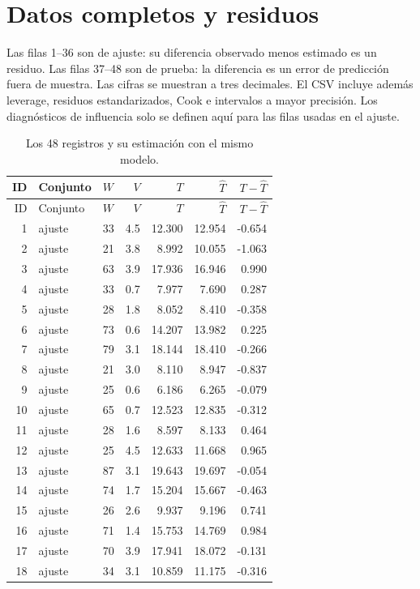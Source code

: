 \documentclass[11pt,a4paper]{article}
\begin{document}
\section{Datos completos y residuos}
Las filas 1--36 son de ajuste: su diferencia observado menos estimado es un residuo. Las filas 37--48 son de prueba: la diferencia es un error de predicción fuera de muestra. Las cifras se muestran a tres decimales. El CSV incluye además leverage, residuos estandarizados, Cook e intervalos a mayor precisión. Los diagnósticos de influencia solo se definen aquí para las filas usadas en el ajuste.
\small
\begin{longtable}{rllrrrr}
\caption{Los 48 registros y su estimación con el mismo modelo.}\\
\toprule ID & Conjunto & $W$ & $V$ & $T$ & $\widehat T$ & $T-\widehat T$\\\midrule\endfirsthead
\toprule ID & Conjunto & $W$ & $V$ & $T$ & $\widehat T$ & $T-\widehat T$\\\midrule\endhead
1 & ajuste & 33 & 4.5 & 12.300 & 12.954 & -0.654\\
2 & ajuste & 21 & 3.8 & 8.992 & 10.055 & -1.063\\
3 & ajuste & 63 & 3.9 & 17.936 & 16.946 & 0.990\\
4 & ajuste & 33 & 0.7 & 7.977 & 7.690 & 0.287\\
5 & ajuste & 28 & 1.8 & 8.052 & 8.410 & -0.358\\
6 & ajuste & 73 & 0.6 & 14.207 & 13.982 & 0.225\\
7 & ajuste & 79 & 3.1 & 18.144 & 18.410 & -0.266\\
8 & ajuste & 21 & 3.0 & 8.110 & 8.947 & -0.837\\
9 & ajuste & 25 & 0.6 & 6.186 & 6.265 & -0.079\\
10 & ajuste & 65 & 0.7 & 12.523 & 12.835 & -0.312\\
11 & ajuste & 28 & 1.6 & 8.597 & 8.133 & 0.464\\
12 & ajuste & 25 & 4.5 & 12.633 & 11.668 & 0.965\\
13 & ajuste & 87 & 3.1 & 19.643 & 19.697 & -0.054\\
14 & ajuste & 74 & 1.7 & 15.204 & 15.667 & -0.463\\
15 & ajuste & 26 & 2.6 & 9.937 & 9.196 & 0.741\\
16 & ajuste & 71 & 1.4 & 15.753 & 14.769 & 0.984\\
17 & ajuste & 70 & 3.9 & 17.941 & 18.072 & -0.131\\
18 & ajuste & 34 & 3.1 & 10.859 & 11.175 & -0.316\\

\end{longtable}
\end{document}
